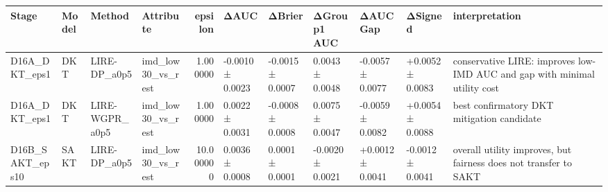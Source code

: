 \begin{tabular}{llllrllllll}
\toprule
Stage & Model & Method & Attribute & epsilon & ΔAUC & ΔBrier & ΔGroup1 AUC & ΔAUC Gap & ΔSigned & interpretation \\
\midrule
D16A_DKT_eps1 & DKT & LIRE-DP_a0p5 & imd_low30_vs_rest & 1.000000 & -0.0010 ± 0.0023 & -0.0015 ± 0.0007 & 0.0043 ± 0.0048 & -0.0057 ± 0.0077 & +0.0052 ± 0.0083 & conservative LIRE: improves low-IMD AUC and gap with minimal utility cost \\
D16A_DKT_eps1 & DKT & LIRE-WGPR_a0p5 & imd_low30_vs_rest & 1.000000 & 0.0022 ± 0.0031 & -0.0008 ± 0.0008 & 0.0075 ± 0.0047 & -0.0059 ± 0.0082 & +0.0054 ± 0.0088 & best confirmatory DKT mitigation candidate \\
D16B_SAKT_eps10 & SAKT & LIRE-DP_a0p5 & imd_low30_vs_rest & 10.000000 & 0.0036 ± 0.0008 & 0.0001 ± 0.0001 & -0.0020 ± 0.0021 & +0.0012 ± 0.0041 & -0.0012 ± 0.0041 & overall utility improves, but fairness does not transfer to SAKT \\
\bottomrule
\end{tabular}
